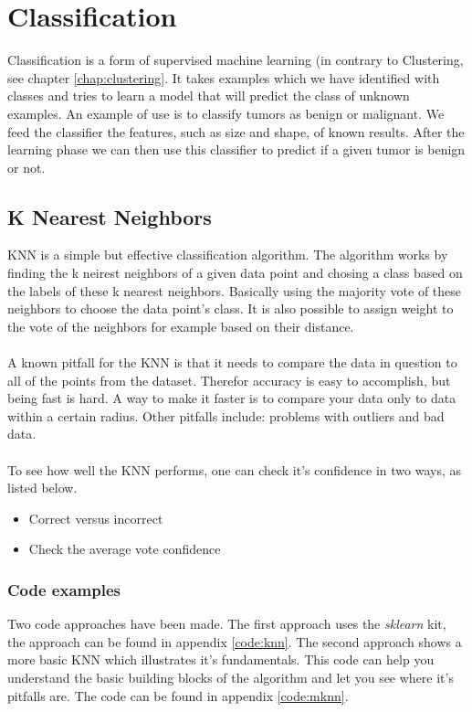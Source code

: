 \chapter{Classification}
Classification is a form of supervised machine learning (in contrary to Clustering, see chapter \ref{chap:clustering}. It takes examples which we have identified with classes and tries to learn a model that will predict the class of unknown examples. An example of use is to classify tumors as benign or malignant. We feed the classifier the features, such as size and shape, of known results. After the learning phase we can then use this classifier to predict if a given tumor is benign or not.

\section{K Nearest Neighbors}
KNN is a simple but effective classification algorithm. The algorithm works by finding the k neirest neighbors of a given data point and chosing a class based on the labels of these k nearest neighbors. Basically using the majority vote of these neighbors to choose the data point's class. It is also possible to assign weight to the vote of the neighbors for example based on their distance.
\\\\
A known pitfall for the KNN is that it needs to compare the data in question to all of the points from the dataset. Therefor accuracy is easy to accomplish, but being fast is hard. A way to make it faster is to compare your data only to data within a certain radius. Other pitfalls include: problems with outliers and bad data.
\\\\
To see how well the KNN performs, one can check it's confidence in two ways, as listed below.
\begin{itemize}
\item Correct versus incorrect
\item Check the average vote confidence
\end{itemize}

\subsection{Code examples}
Two code approaches have been made. The first approach uses the \emph{sklearn} kit, the approach can be found in appendix \ref{code:knn}. The second approach shows a more basic KNN which illustrates it's fundamentals. This code can help you understand the basic building blocks of the algorithm and let you see where it's pitfalls are. The code can be found in appendix \ref{code:mknn}.

